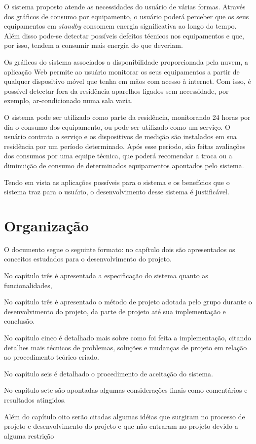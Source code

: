 O sistema proposto atende as necessidades do usuário de várias formas. Através dos gráficos de consumo por equipamento, o usuário poderá perceber que os seus equipamentos em \textit{standby} consomem energia significativa ao longo do tempo. Além disso pode-se detectar possíveis defeitos técnicos nos equipamentos e que, por isso, tendem a consumir mais energia do que deveriam.

Os gráficos do sistema associados a disponibilidade proporcionada pela nuvem, a aplicação Web permite ao usuário monitorar os seus equipamentos a partir de qualquer dispositivo móvel que tenha em mãos com acesso à internet. Com isso, é possível detectar fora da residência aparelhos ligados sem necessidade, por exemplo, ar-condicionado numa sala vazia.

O sistema pode ser utilizado como parte da residência, monitorando 24 horas por dia o consumo dos equipamento, ou pode ser utilizado como um serviço. O usuário contrata o serviço e os dispositivos de medição são instalados em sua residência por um período determinado. Após esse período, são feitas avaliações dos consumos por uma equipe técnica, que poderá recomendar a troca ou a diminuição de consumo de determinados equipamentos apontados pelo sistema.

Tendo em vista as aplicações possíveis para o sistema e os benefícios que o sistema traz para o usuário, o desenvolvimento desse sistema é justificável.

\section{Organização}
\label{Sec:organizacao}

O documento segue o seguinte formato: no capítulo dois são apresentados os conceitos estudados para o desenvolvimento do projeto.

No capítulo três é apresentada a especificação do sistema quanto as funcionalidades, 

No capítulo três é apresentado o método de projeto adotada pelo grupo durante o desenvolvimento do projeto, da parte de projeto até sua implementação e conclusão.

No capítulo cinco é detalhado mais sobre como foi feita a implementação, citando detalhes mais técnicos de problemas, soluções e mudanças de projeto em relação ao procedimento teórico criado.

No capítulo seis é detalhado o procedimento de aceitação do sistema.

No capítulo sete são apontadas algumas considerações finais como comentários e resultados atingidos.

Além do capítulo oito serão citadas algumas idéias que surgiram no processo de projeto e desenvolvimento do projeto e que não entraram no projeto devido a alguma restrição